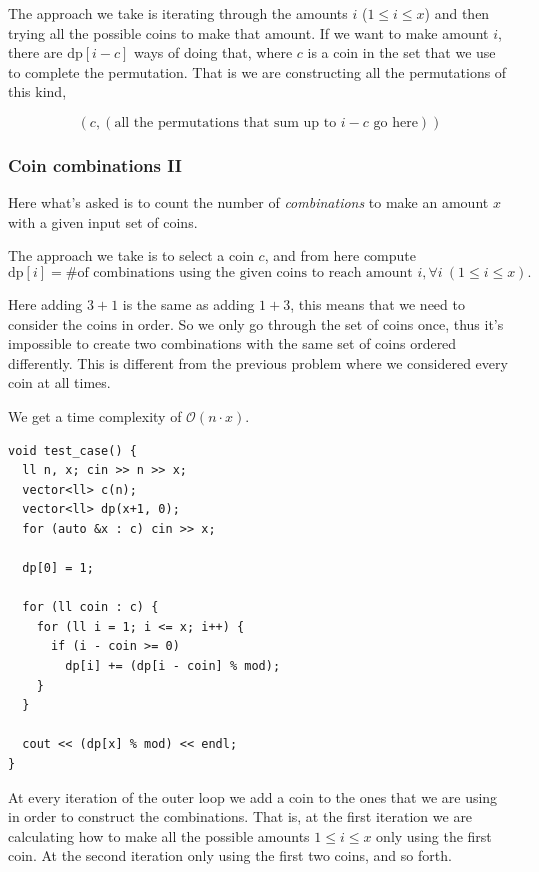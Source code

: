The approach we take is iterating through the amounts $i$ ($1 \leq i \leq x$) and then trying all the possible coins to make that amount. If we want to make amount $i$, there are $\text{dp}[i - c]$ ways of doing that, where $c$ is a coin in the set that we use to complete the permutation. 
That is we are constructing all the permutations of this kind,

\begin{equation}
    (c, (\text{all the permutations that sum up to } i - c \text{ go here}))
\end{equation}


\subsubsection{Coin combinations II}

Here what's asked is to count the number of \textit{combinations} to make an amount $x$ with a given input set of coins. 

The approach we take is to select a coin $c$, and from here compute
\begin{equation}
    \text{dp}[i] = \text{\# of combinations using the given coins to reach amount } i, \forall i\ (1 \leq i \leq x). 
\end{equation}


\begin{idea}
    Here adding $3 + 1$ is the same as adding $1 + 3$, this means that we need to consider the coins in order. So we only go through the set of coins once, thus it's impossible to create two combinations with the same set of coins ordered differently. This is different from the previous problem where we considered every coin at all times.
\end{idea}

We get a time complexity of $\mathcal{O}(n \cdot x)$.

\begin{verbatim}
void test_case() {
  ll n, x; cin >> n >> x;
  vector<ll> c(n);
  vector<ll> dp(x+1, 0);
  for (auto &x : c) cin >> x;

  dp[0] = 1;

  for (ll coin : c) {
    for (ll i = 1; i <= x; i++) {
      if (i - coin >= 0)
        dp[i] += (dp[i - coin] % mod);
    }
  }
  
  cout << (dp[x] % mod) << endl;
}
\end{verbatim}

At every iteration of the outer loop we add a coin to the ones that we are using in order to construct the combinations. That is, at the first iteration we are calculating how to make all the possible amounts $1 \leq i \leq x$ only using the first coin. At the second iteration only using the first two coins, and so forth.


